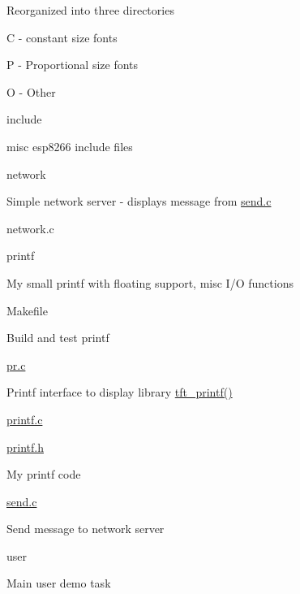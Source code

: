 \begin{DoxyItemize}
\begin{DoxyItemize}
\begin{DoxyItemize}
\begin{DoxyItemize}
\item Reorganized into three directories
\begin{DoxyItemize}
\item C -\/ constant size fonts
\item P -\/ Proportional size fonts
\item O -\/ Other
\end{DoxyItemize}
\end{DoxyItemize}
\end{DoxyItemize}
\end{DoxyItemize}
\item include
\begin{DoxyItemize}
\item misc esp8266 include files
\end{DoxyItemize}
\item network
\begin{DoxyItemize}
\item Simple network server -\/ displays message from \hyperlink{send_8c}{send.\-c}
\begin{DoxyItemize}
\item network.\-c
\end{DoxyItemize}
\end{DoxyItemize}
\item printf
\begin{DoxyItemize}
\item My small printf with floating support, misc I/\-O functions
\begin{DoxyItemize}
\item Makefile
\begin{DoxyItemize}
\item Build and test printf
\end{DoxyItemize}
\item \hyperlink{pr_8c}{pr.\-c}
\begin{DoxyItemize}
\item Printf interface to display library \hyperlink{pr_8c_ad6d6dda4facdc045d477c0cc9403e0c1}{tft\-\_\-printf()}
\end{DoxyItemize}
\item \hyperlink{printf_8c}{printf.\-c}
\item \hyperlink{printf_8h}{printf.\-h}
\begin{DoxyItemize}
\item My printf code
\end{DoxyItemize}
\end{DoxyItemize}
\end{DoxyItemize}
\item \hyperlink{send_8c}{send.\-c}
\begin{DoxyItemize}
\item Send message to network server
\end{DoxyItemize}
\item user
\begin{DoxyItemize}
\item Main user demo task 
\end{DoxyItemize}
\end{DoxyItemize}